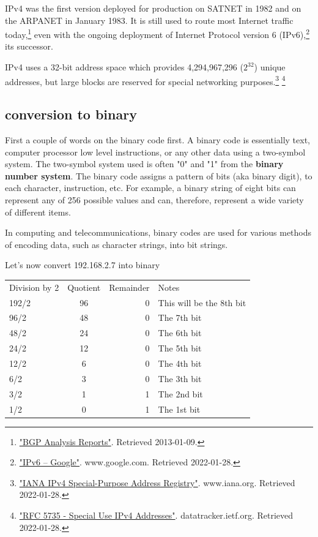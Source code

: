 \documentclass[a4paper,12pt]{article}
\begin{document}
IPv4 was the first version deployed for production on SATNET in 1982 and on the ARPANET in January 1983. It is still used to route most Internet traffic today,\footnote{\label{note2}\href{http://bgp.potaroo.net/index-bgp.html}{"BGP Analysis Reports"}. Retrieved 2013-01-09.} even with the ongoing deployment of Internet Protocol version 6 (IPv6),\footnote{\label{note3}\href{https://www.google.com/intl/en/ipv6/statistics.html}{"IPv6 – Google"}. www.google.com. Retrieved 2022-01-28.} its successor.

IPv4 uses a 32-bit address space which provides 4,294,967,296 ($2^{32}$) unique addresses, but large blocks are reserved for special networking purposes.\footnote{\label{note4}\href{https://www.iana.org/assignments/iana-ipv4-special-registry/iana-ipv4-special-registry.xhtml}{"IANA IPv4 Special-Purpose Address Registry"}. www.iana.org. Retrieved 2022-01-28.} \footnote{\label{note5}\href{https://datatracker.ietf.org/doc/html/rfc5735}{"RFC 5735 - Special Use IPv4 Addresses"}. datatracker.ietf.org. Retrieved 2022-01-28.}




\subsection{conversion to binary}

First a couple of words on the binary code first. A binary code is essentially text, computer processor low level instructions, or any other data using a two-symbol system. The two-symbol system used is often "0" and "1" from the \textbf{binary number system}. The binary code assigns a pattern of bits (aka binary digit), to each character, instruction, etc. For example, a binary string of eight bits can represent any of 256 possible values and can, therefore, represent a wide variety of different items.

In computing and telecommunications, binary codes are used for various methods of encoding data, such as character strings, into bit strings. 

Let's now convert 192.168.2.7 into binary

\begin{tabular}{||l|c|r|p{5cm}||}
    Division by 2 & Quotient & Remainder & Notes \\
    192/2 & 96 & 0 & This will be the 8th bit \\
    96/2 & 48 & 0 & The 7th bit \\
    48/2 & 24 & 0 & The 6th bit \\
    24/2 & 12 & 0 & The 5th bit \\
    12/2 & 6 & 0 & The 4th bit \\
    6/2 & 3 & 0 & The 3th bit \\
    3/2 & 1 & 1 & The 2nd bit \\
    1/2 & 0 & 1 & The 1st bit \\
\end{tabular}




\clearpage
\printindex
\end{document}
